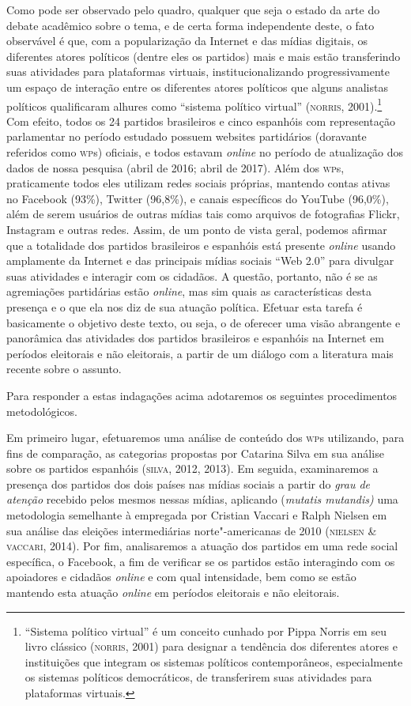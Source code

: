 Como pode ser observado pelo quadro, qualquer que seja o estado da arte
do debate acadêmico sobre o tema, e de certa forma independente deste, o
fato observável é que, com a popularização da Internet e das mídias
digitais, os diferentes atores políticos (dentre eles os partidos) mais
e mais estão transferindo suas atividades para plataformas virtuais,
institucionalizando progressivamente um espaço de interação entre os
diferentes atores políticos que alguns analistas políticos qualificaram
alhures como ``sistema político virtual'' (\textsc{norris}, 2001).\footnote{``Sistema
  político virtual'' é um conceito cunhado por Pippa Norris em seu livro
  clássico (\textsc{norris}, 2001) para designar a tendência dos diferentes
  atores e instituições que integram os sistemas políticos
  contemporâneos, especialmente os sistemas políticos democráticos, de
  transferirem suas atividades para plataformas virtuais.} Com efeito,
todos os 24 partidos brasileiros e cinco espanhóis com representação
parlamentar no período estudado possuem websites partidários (doravante
referidos como \textsc{wp}s) oficiais, e todos estavam \emph{online} no período de
atualização dos dados de nossa pesquisa (abril de 2016; abril de 2017).
Além dos \textsc{wp}s, praticamente todos eles utilizam redes sociais próprias,
mantendo contas ativas no Facebook (93\%), Twitter (96,8\%), e canais
específicos do YouTube (96,0\%), além de serem usuários de outras mídias
tais como arquivos de fotografias Flickr, Instagram e outras redes.
Assim, de um ponto de vista geral, podemos afirmar que a totalidade dos
partidos brasileiros e espanhóis está presente \emph{online} usando amplamente
da Internet e das principais mídias sociais ``Web 2.0'' para divulgar
suas atividades e interagir com os cidadãos. A questão, portanto, não é
se as agremiações partidárias estão \emph{online}, mas sim quais as
características desta presença e o que ela nos diz de sua atuação
política. Efetuar esta tarefa é basicamente o objetivo deste texto, ou
seja, o de oferecer uma visão abrangente e panorâmica das atividades dos
partidos brasileiros e espanhóis na Internet em períodos eleitorais e
não eleitorais, a partir de um diálogo com a literatura mais recente
sobre o assunto.

Para responder a estas indagações acima adotaremos os seguintes
procedimentos metodológicos.

Em primeiro lugar, efetuaremos uma análise de conteúdo dos \textsc{wp}s
utilizando, para fins de comparação, as categorias propostas por
Catarina Silva em sua análise sobre os partidos espanhóis (\textsc{silva}, 2012,
2013). Em seguida, examinaremos a presença dos partidos dos dois países
nas mídias sociais a partir do \emph{grau de atenção} recebido pelos
mesmos nessas mídias, aplicando (\emph{mutatis mutandis)} uma
metodologia semelhante à empregada por Cristian Vaccari e Ralph Nielsen
em sua análise das eleições intermediárias norte"-americanas de 2010
(\textsc{nielsen \& vaccari}, 2014). Por fim, analisaremos a atuação dos partidos
em uma rede social específica, o Facebook, a fim de verificar se os
partidos estão interagindo com os apoiadores e cidadãos \emph{online} e com
qual intensidade, bem como se estão mantendo esta atuação \emph{online} em
períodos eleitorais e não eleitorais.

